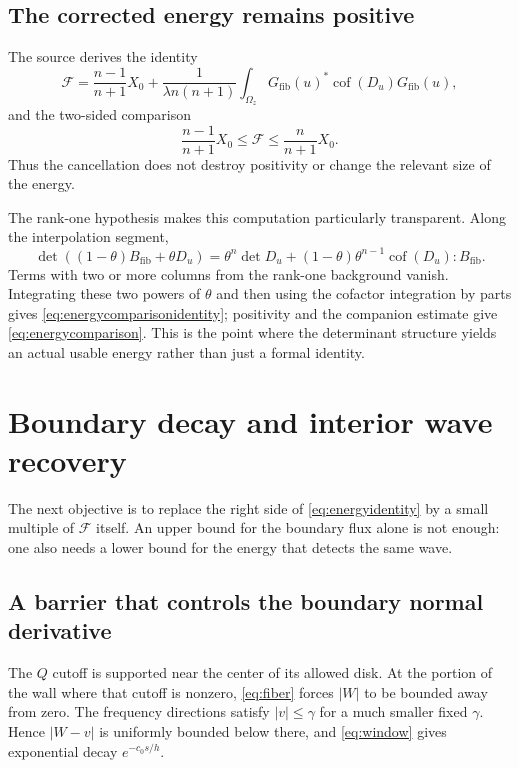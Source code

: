 \documentclass[11pt,a4paper]{article}
\numberwithin{equation}{section}
\theoremstyle{definition}
\theoremstyle{remark}
\begin{document}
\subsection{The corrected energy remains positive}
The source derives the identity
\begin{equation}\label{eq:energycomparisonidentity}
 \mathcal F=\frac{n-1}{n+1}X_0+
 \frac{1}{\lambda n(n+1)}
 \int_{\Omega_z}G_{\mathrm{fib}}(u)^*
              \operatorname{cof}(D_u)G_{\mathrm{fib}}(u),
\end{equation}
and the two-sided comparison
\begin{equation}\label{eq:energycomparison}
 \frac{n-1}{n+1}X_0\le\mathcal F\le\frac n{n+1}X_0.
\end{equation}
Thus the cancellation does not destroy positivity or change the relevant
size of the energy.

The rank-one hypothesis makes this computation particularly transparent. Along
the interpolation segment,
\[
 \det((1-\theta)B_{\mathrm{fib}}+\theta D_u)
 =\theta^n\det D_u+
  (1-\theta)\theta^{n-1}\operatorname{cof}(D_u):B_{\mathrm{fib}}.
\]
Terms with two or more columns from the rank-one background vanish. Integrating
these two powers of $\theta$ and then using the cofactor integration by parts
gives \eqref{eq:energycomparisonidentity}; positivity and the companion estimate
give \eqref{eq:energycomparison}. This is the point where the determinant
structure yields an actual usable energy rather than just a formal identity.

\section{Boundary decay and interior wave recovery}
\label{sec:barriers}
The next objective is to replace the right side of
\eqref{eq:energyidentity} by a small multiple of $\mathcal F$ itself.
An upper bound for the boundary flux alone is not enough: one also needs a
lower bound for the energy that detects the same wave.

\subsection{A barrier that controls the boundary normal derivative}
The $Q$ cutoff is supported near the center of its allowed disk. At the portion
of the wall where that cutoff is nonzero, \eqref{eq:fiber} forces $|W|$ to be
bounded away from zero. The frequency directions satisfy $|v|\le\gamma$ for
a much smaller fixed $\gamma$. Hence $|W-v|$ is uniformly bounded below there,
and \eqref{eq:window} gives exponential decay $e^{-c_0s/h}$.
\end{document}
